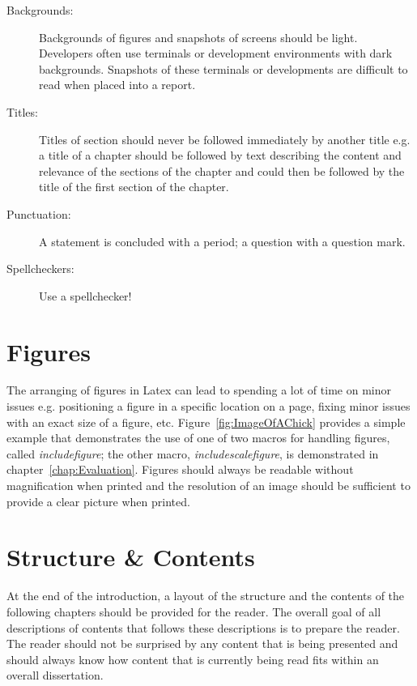 \begin{description}
	\item [Backgrounds:] Backgrounds of figures and snapshots of screens should be light. Developers often use terminals or development environments with dark backgrounds. Snapshots of these terminals or developments are difficult to read when placed into a report. 
	\item [Titles:] Titles of section should never be followed immediately by another title e.g. a title of a chapter should be followed by text describing the content and relevance of the sections of the chapter and could then be followed by the title of the first section of the chapter.
	\item [Punctuation:] A statement is concluded with a period; a question with a question mark.  
	\item [Spellcheckers:] Use a spellchecker!
\end{description}


\section{Figures} 

The arranging of figures in Latex can lead to spending a lot of time on minor issues e.g. positioning a figure in a specific location on a page, fixing minor issues with an exact size of a figure, etc. Figure~\ref{fig:ImageOfAChick} provides a simple example that demonstrates the use of one of two macros for handling figures, called {\it includefigure}; the other macro,  {\it includescalefigure}, is demonstrated in chapter~\ref{chap:Evaluation}. Figures should always be readable without magnification when printed and the resolution of an image should be sufficient to provide a clear picture when printed.



\section{Structure \& Contents}

At the end of the introduction, a layout of the structure and the contents of the following chapters should be provided for the reader. The overall goal of all descriptions of contents that follows these descriptions is to prepare the reader. The reader should not be surprised by any content that is being presented and should always know how content that is currently being read fits within an overall dissertation.